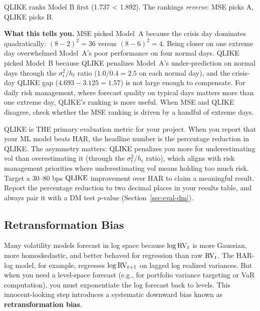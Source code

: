 \begin{workedexample}
QLIKE ranks Model B first (1.737 < 1.892).
The rankings \emph{reverse}: MSE picks A, QLIKE picks B.

\textbf{What this tells you.}
MSE picked Model~A because the crisis day dominates quadratically: $(8-2)^2 = 36$ versus $(8-6)^2 = 4$.
Being closer on one extreme day overwhelmed Model~A's poor performance on four normal days.
QLIKE picked Model~B because QLIKE penalizes Model~A's under-prediction on normal days through the $\sigma^2_t / h_t$ ratio ($1.0/0.4 = 2.5$ on each normal day), and the crisis-day QLIKE gap ($4.693 - 3.125 = 1.57$) is not large enough to compensate.
For daily risk management, where forecast quality on typical days matters more than one extreme day, QLIKE's ranking is more useful.
When MSE and QLIKE disagree, check whether the MSE ranking is driven by a handful of extreme days.
\end{workedexample}

\begin{projectconnection}
QLIKE is THE primary evaluation metric for your project.
When you report that your ML model beats HAR, the headline number is the percentage reduction in QLIKE.
The asymmetry matters: QLIKE penalizes you more for underestimating vol than overestimating it (through the $\sigma^2_t / h_t$ ratio), which aligns with risk management priorities where underestimating vol means holding too much risk.
Target a 30--80 bps $\operatorname{QLIKE}$ improvement over HAR to claim a meaningful result.
Report the percentage reduction to two decimal places in your results table, and always pair it with a DM test $p$-value (Section~\ref{sec:eval-dm}).
\end{projectconnection}


\subsection{Retransformation Bias}
\label{sec:eval-retransformation}

Many volatility models forecast in log space because $\log \operatorname{RV}_t$ is more Gaussian, more homoskedastic, and better behaved for regression than raw $\operatorname{RV}_t$.
The HAR-log model, for example, regresses $\log \operatorname{RV}_{t+1}$ on lagged log realized variances.
But when you need a level-space forecast (e.g., for portfolio variance targeting or VaR computation), you must exponentiate the log forecast back to levels.
This innocent-looking step introduces a systematic downward bias known as \textbf{retransformation bias}.

